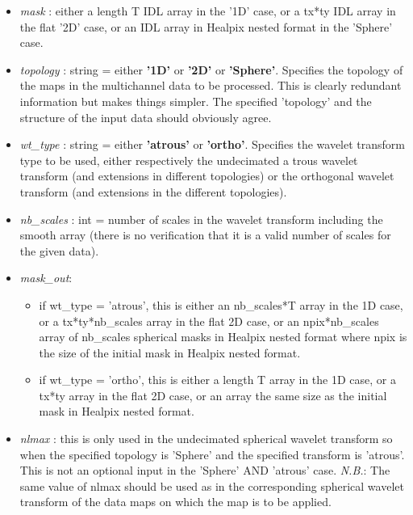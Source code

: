 \begin{itemize}
\item {\em mask} : either a length T IDL array in the '1D' case, or a tx*ty IDL array in the flat '2D' case, 
or an IDL array in Healpix nested format in the 'Sphere' case.

\item {\em topology} : string = either \textbf{'1D'} or \textbf{'2D'} or \textbf{'Sphere'}. Specifies the topology 
of the maps in the multichannel data to be processed. This is clearly redundant information but makes things simpler. 
The specified 'topology' and the structure of the input data should obviously agree.

\item {\em wt\_type} : string  = either \textbf{'atrous'} or \textbf{'ortho'}. Specifies the wavelet transform type 
to be used, either respectively the undecimated a trous wavelet transform (and extensions in different topologies) 
or the orthogonal wavelet transform (and extensions in the different topologies).

\item {\em nb\_scales} : int = number of scales in the wavelet transform including the smooth array (there is no verification that it is a valid number of scales for the given data).

\item {\em mask\_out}:  
\begin{itemize}
\item{ if wt\_type = 'atrous'}, this is either an nb\_scales*T array in the 1D case, or a tx*ty*nb\_scales array 
in the flat 2D case, or an npix*nb\_scales array of nb\_scales spherical masks in Healpix nested format where npix 
is the size of the initial mask in Healpix nested format.
\item{ if wt\_type = 'ortho'}, this is either a length T array in the 1D case, or a tx*ty array in the flat 2D case, 
or an array the same size as the initial mask in Healpix nested format.		
\end{itemize}

\item {\em nlmax} : this is only used in the undecimated spherical wavelet transform so when the specified topology 
is 'Sphere' and the specified transform is 'atrous'. This is not an optional input in the 'Sphere' AND 'atrous' case. 
\emph{N.B.}: The same value of nlmax should be used as in the corresponding spherical wavelet transform of the data 
maps on which the map is to be applied.
\end{itemize}


